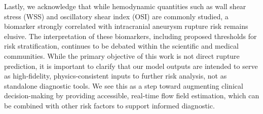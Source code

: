 Lastly, we acknowledge that while hemodynamic quantities such as wall shear stress (WSS) and oscillatory shear index (OSI) are commonly studied, a biomarker strongly correlated with intracranial aneurysm rupture risk remains elusive. The interpretation of these biomarkers, including proposed thresholds for risk stratification, continues to be debated within the scientific and medical communities. While the primary objective of this work is not direct rupture prediction, it is important to clarify that our model outputs are intended to serve as high-fidelity, physics-consistent inputs to further risk analysis, not as standalone diagnostic tools. We see this as a step toward augmenting clinical decision-making by providing accessible, real-time flow field estimation, which can be combined with other risk factors to support informed diagnostic.
